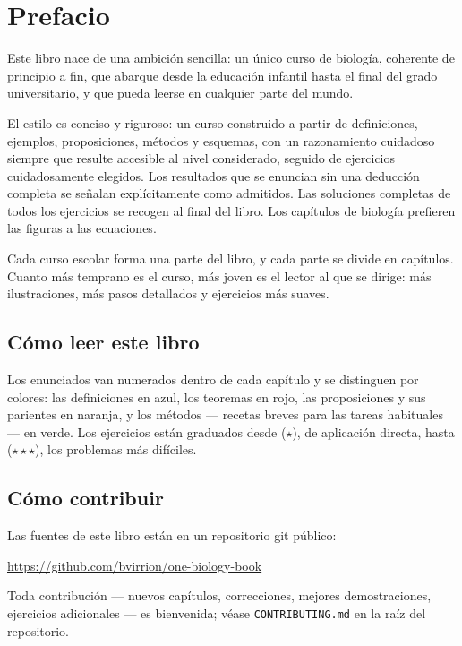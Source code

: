\chapter{Prefacio}

Este libro nace de una ambición sencilla: un único curso de biología,
coherente de principio a fin, que abarque desde la educación infantil
hasta el final del grado universitario, y que pueda leerse en
cualquier parte del mundo.

El estilo es conciso y riguroso: un curso construido a partir de
definiciones, ejemplos, proposiciones, métodos y esquemas, con un razonamiento
cuidadoso siempre que resulte accesible al nivel considerado, seguido de
ejercicios cuidadosamente elegidos. Los resultados que se enuncian sin una
deducción completa se señalan explícitamente como admitidos. Las soluciones
completas de todos los ejercicios se recogen al final del libro. Los capítulos
de biología prefieren las figuras a las ecuaciones.

Cada curso escolar forma una parte del libro, y cada parte se divide en
capítulos. Cuanto más temprano es el curso, más joven es el lector al que
se dirige: más ilustraciones, más pasos detallados y ejercicios más
suaves.

\section*{Cómo leer este libro}

Los enunciados van numerados dentro de cada capítulo y se distinguen por
colores: las definiciones en azul, los teoremas en rojo, las
proposiciones y sus parientes en naranja, y los métodos --- recetas
breves para las tareas habituales --- en verde. Los ejercicios están
graduados desde ($\star$), de aplicación directa, hasta
($\star\star\star$), los problemas más difíciles.

\section*{Cómo contribuir}

Las fuentes de este libro están en un repositorio git público:
\begin{center}
\url{https://github.com/bvirrion/one-biology-book}
\end{center}
Toda contribución --- nuevos capítulos, correcciones, mejores
demostraciones, ejercicios adicionales --- es bienvenida; véase
\texttt{CONTRIBUTING.md} en la raíz del repositorio.
